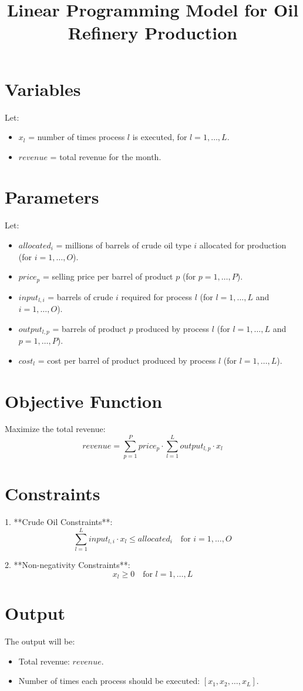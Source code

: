 \documentclass{article}
\begin{document}
\title{Linear Programming Model for Oil Refinery Production}
\author{}
\date{}
\maketitle

\section*{Variables}
Let:
\begin{itemize}
    \item $x_l$ = number of times process $l$ is executed, for $l = 1, \ldots, L$.
    \item $revenue$ = total revenue for the month.
\end{itemize}

\section*{Parameters}
Let:
\begin{itemize}
    \item $allocated_i$ = millions of barrels of crude oil type $i$ allocated for production (for $i = 1, \ldots, O$).
    \item $price_p$ = selling price per barrel of product $p$ (for $p = 1, \ldots, P$).
    \item $input_{l,i}$ = barrels of crude $i$ required for process $l$ (for $l = 1, \ldots, L$ and $i = 1, \ldots, O$).
    \item $output_{l,p}$ = barrels of product $p$ produced by process $l$ (for $l = 1, \ldots, L$ and $p = 1, \ldots, P$).
    \item $cost_l$ = cost per barrel of product produced by process $l$ (for $l = 1, \ldots, L$).
\end{itemize}

\section*{Objective Function}
Maximize the total revenue:
\[
revenue = \sum_{p=1}^{P} price_p \cdot \sum_{l=1}^{L} output_{l,p} \cdot x_l
\]

\section*{Constraints}
1. **Crude Oil Constraints**:
\[
\sum_{l=1}^{L} input_{l,i} \cdot x_l \leq allocated_i \quad \text{for } i = 1, \ldots, O
\]

2. **Non-negativity Constraints**:
\[
x_l \geq 0 \quad \text{for } l = 1, \ldots, L
\]

\section*{Output}
The output will be:
\begin{itemize}
    \item Total revenue: $revenue$.
    \item Number of times each process should be executed: $[x_1, x_2, \ldots, x_L]$.
\end{itemize}
\end{document}
